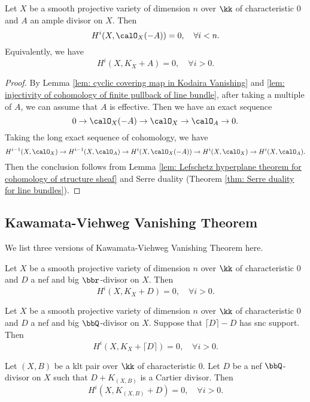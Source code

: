     \begin{theorem}\label{thm: Kodaira Vanishing Theorem}
        Let \(X\) be a smooth projective variety of dimension \(n\) over \(\kk\) of characteristic \(0\) and \(A\) an ample divisor on \(X\). 
        Then
        \[
            H^i(X, \calO_X(-A)) = 0,\quad \forall i < n.
        \]
        Equivalently, we have
        \[
            H^i(X, K_X + A) = 0,\quad \forall i > 0.
        \]
    \end{theorem}
    \begin{proof}
        By Lemma \ref{lem: cyclic covering map in Kodaira Vanishing} and \ref{lem: injectivity of cohomology of finite pullback of line bundle}, after taking a multiple of \(A\), we can assume that \(A\) is effective.
        Then we have an exact sequence
        \[ 0 \to \calO_X(-A) \to \calO_X \to \calO_A \to 0. \]
        Taking the long exact sequence of cohomology, we have
        \[ H^{i-1}(X,\calO_X) \to H^{i-1}(X, \calO_A) \to H^{i}(X, \calO_X(-A)) \to H^{i}(X, \calO_X) \to H^{i}(X, \calO_A). \]
        Then the conclusion follows from Lemma \ref{lem: Lefschetz hyperplane theorem for cohomology of structure sheaf} and Serre duality (Theorem \ref{thm: Serre duality for line bundles}).
    \end{proof}


\subsection{Kawamata-Viehweg Vanishing Theorem}

    We list three versions of Kawamata-Viehweg Vanishing Theorem here.

    \begin{theorem}\label{thm: Kawamata-Viehweg Vanishing Theorem for nef and big divisor}
        Let \(X\) be a smooth projective variety of dimension \(n\) over \(\kk\) of characteristic \(0\) and \(D\) a nef and big \(\bbr\)-divisor on \(X\).
        Then 
        \[ H^i(X, K_X + D) = 0,\quad \forall i > 0. \]
    \end{theorem}
    \begin{theorem}\label{thm: Kawamata-Viehweg Vanishing Theorem in KM98}
        Let \(X\) be a smooth projective variety of dimension \(n\) over \(\kk\) of characteristic \(0\) and \(D\) a nef and big \(\bbQ\)-divisor on \(X\).
        Suppose that \(\lceil D \rceil - D\) has snc support.
        Then
        \[
            H^i(X, K_X + \lceil D \rceil) = 0,\quad \forall i > 0.
        \]
    \end{theorem}
    \begin{theorem}\label{thm: Kawamata-Viehweg Vanishing Theorem for klt pair}
        Let \((X,B)\) be a klt pair over \(\kk\) of characteristic \(0\).
        Let \(D\) be a nef \(\bbQ\)-divisor on \(X\) such that \(D + K_{(X,B)}\) is a Cartier divisor.
        Then
        \[ H^i(X, K_{(X,B)} + D) = 0,\quad \forall i > 0. \]
    \end{theorem}

